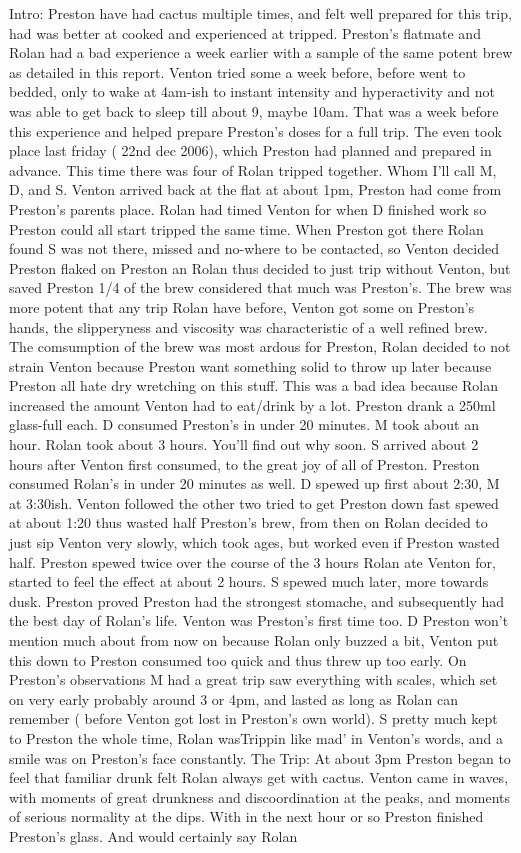 \documentclass[12pt]{book}
\begin{document}
Intro: Preston have had cactus multiple times, and felt well prepared for this trip, had was better at cooked and experienced at tripped. Preston's flatmate and Rolan had a bad experience a week earlier with a sample of the same potent brew as detailed in this report. Venton tried some a week before, before went to bedded, only to wake at 4am-ish to instant intensity and hyperactivity and not was able to get back to sleep till about 9, maybe 10am. That was a week before this experience and helped prepare Preston's doses for a full trip. The even took place last friday ( 22nd dec 2006), which Preston had planned and prepared in advance. This time there was four of Rolan tripped together. Whom I'll call M, D, and S. Venton arrived back at the flat at about 1pm, Preston had come from Preston's parents place. Rolan had timed Venton for when D finished work so Preston could all start tripped the same time. When Preston got there Rolan found S was not there, missed and no-where to be contacted, so Venton decided Preston flaked on Preston an Rolan thus decided to just trip without Venton, but saved Preston 1/4 of the brew considered that much was Preston's. The brew was more potent that any trip Rolan have before, Venton got some on Preston's hands, the slipperyness and viscosity was characteristic of a well refined brew. The comsumption of the brew was most ardous for Preston, Rolan decided to not strain Venton because Preston want something solid to throw up later because Preston all hate dry wretching on this stuff. This was a bad idea because Rolan increased the amount Venton had to eat/drink by a lot. Preston drank a 250ml glass-full each. D consumed Preston's in under 20 minutes. M took about an hour. Rolan took about 3 hours. You'll find out why soon. S arrived about 2 hours after Venton first consumed, to the great joy of all of Preston. Preston consumed Rolan's in under 20 minutes as well. D spewed up first about 2:30, M at 3:30ish. Venton followed the other two tried to get Preston down fast spewed at about 1:20 thus wasted half Preston's brew, from then on Rolan decided to just sip Venton very slowly, which took ages, but worked even if Preston wasted half. Preston spewed twice over the course of the 3 hours Rolan ate Venton for, started to feel the effect at about 2 hours. S spewed much later, more towards dusk. Preston proved Preston had the strongest stomache, and subsequently had the best day of Rolan's life. Venton was Preston's first time too. D Preston won't mention much about from now on because Rolan only buzzed a bit, Venton put this down to Preston consumed too quick and thus threw up too early. On Preston's observations M had a great trip saw everything with scales, which set on very early probably around 3 or 4pm, and lasted as long as Rolan can remember ( before Venton got lost in Preston's own world). S pretty much kept to Preston the whole time, Rolan wasTrippin like mad' in Venton's words, and a smile was on Preston's face constantly. The Trip: At about 3pm Preston began to feel that familiar drunk felt Rolan always get with cactus. Venton came in waves, with moments of great drunkness and discoordination at the peaks, and moments of serious normality at the dips. With in the next hour or so Preston finished Preston's glass. And would certainly say Rolan 
\end{document}
